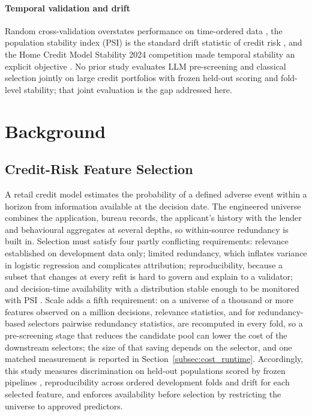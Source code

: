 \documentclass[final,5p,twocolumn]{elsarticle}
\begin{document}
\paragraph{Temporal validation and drift}
Random cross-validation overstates performance on time-ordered data \cite{bergmeir2012,gama2014}, the population stability index (PSI) is the standard drift statistic of credit risk \cite{yurdakul2020}, and the Home Credit Model Stability 2024 competition made temporal stability an explicit objective \cite{homecredit2024}. No prior study evaluates LLM pre-screening and classical selection jointly on large credit portfolios with frozen held-out scoring and fold-level stability; that joint evaluation is the gap addressed here.


\section{Background}
\label{sec:background}

\subsection{Credit-Risk Feature Selection}
\label{subsec:credit_risk_fs}

A retail credit model estimates the probability of a defined adverse event within a horizon from information available at the decision date. The engineered universe combines the application, bureau records, the applicant's history with the lender and behavioural aggregates at several depths, so within-source redundancy is built in. Selection must satisfy four partly conflicting requirements: relevance established on development data only; limited redundancy, which inflates variance in logistic regression and complicates attribution; reproducibility, because a subset that changes at every refit is hard to govern and explain to a validator; and decision-time availability with a distribution stable enough to be monitored with PSI \cite{siddiqi2006,thomas2002,yurdakul2020}. Scale adds a fifth requirement: on a universe of a thousand or more features observed on a million decisions, relevance statistics, and for redundancy-based selectors pairwise redundancy statistics, are recomputed in every fold, so a pre-screening stage that reduces the candidate pool can lower the cost of the downstream selectors; the size of that saving depends on the selector, and one matched measurement is reported in Section~\ref{subsec:cost_runtime}. Accordingly, this study measures discrimination on held-out populations scored by frozen pipelines \cite{bergmeir2012}, reproducibility across ordered development folds and drift for each selected feature, and enforces availability before selection by restricting the universe to approved predictors.
\end{document}
